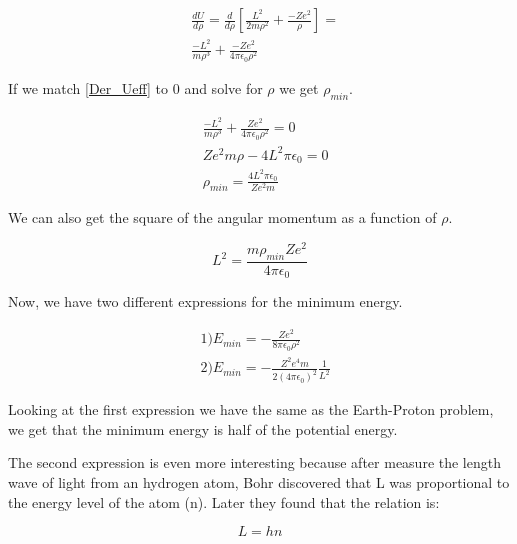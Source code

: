 \begin{equation}
    \label{Der_Ueff}
    \begin{split}
    &\frac{dU}{d\rho} =\frac{d}{d\rho}\left[ \frac{L^2}{2m\rho^2}+ \frac{ -Ze^2}{\rho}\right]=\\
    &\frac{-L^2}{m\rho^3}+\frac{-Ze^2}{4\pi\epsilon_0\rho^2}
    \end{split}
\end{equation}

If we match \ref{Der_Ueff} to 0 and solve for $\rho$ we get $\rho_{min}$.

\begin{equation}
    \label{rho_min}
    \begin{split}
    &\frac{-L^2}{m\rho^3}+\frac{Ze^2}{4\pi\epsilon_0\rho^2} = 0\\
    &Ze^2m\rho - 4 L^2\pi\epsilon_0 = 0\\
    &\rho_{min} = \frac{4L^2\pi\epsilon_0}{Ze^2m}
    \end{split}
\end{equation}

We can also get the square of the angular momentum as a function of $\rho$.

\begin{equation}
    \label{L_min}
    L^2 = \frac{m\rho_{min}Ze^2}{4\pi\epsilon_0}
\end{equation}

Now, we have two different expressions for the minimum energy.

\begin{equation}
    \label{E_min_EP}
    \begin{split}
    &1) E_{min} = -\frac{Ze^2}{8\pi\epsilon_0\rho^2}\\
    &2) E_{min} = -\frac{Z^2e^4m}{2(4\pi\epsilon_0)^2}\frac{1}{L^2}     
    \end{split}
\end{equation}

Looking at the first expression we have the same as the Earth-Proton problem, we get that the minimum energy is half of the potential energy. 

The second expression is even more interesting because after measure the length wave of light from an hydrogen atom, Bohr discovered that L was proportional to the energy level of the atom (n). Later they found that the relation is:

\begin{equation}
    \label{L_min}
    L = hn  
\end{equation}

